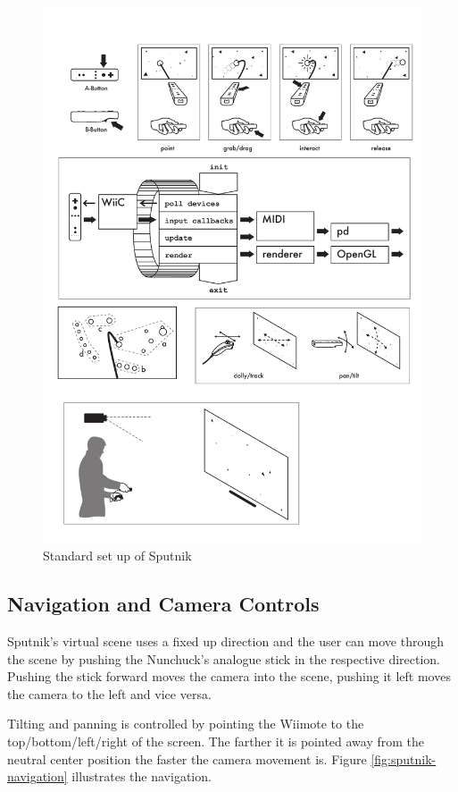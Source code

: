 \documentclass[10pt,a4paper]{scrartcl}
\begin{document}
\begin{figure}[hbtp]
\begin{center}
\includegraphics[width=0.4\columnwidth]{img/setup}
\caption{Standard set up of Sputnik}
\label{fig:sputnik-setup}
\end{center}
\end{figure}



\subsection{Navigation and Camera Controls}
Sputnik's virtual scene uses a fixed up direction and the user can move through the scene by pushing the Nunchuck's analogue stick in the respective direction. Pushing the stick forward moves the camera into the scene, pushing it left moves the camera to the left and vice versa.

Tilting and panning is controlled by pointing the Wiimote to the top/bottom/left/right of the screen. The farther it is pointed away from the neutral center position the faster the camera movement is. Figure \ref{fig:sputnik-navigation} illustrates the navigation.
\end{document}
